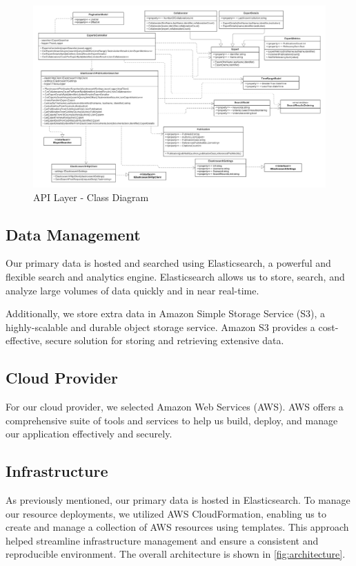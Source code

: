 \begin{figure}[htp]
    \centering
    \includegraphics[width=\textwidth]{Images/API_ClassDiagram.png}
    \caption{API Layer - Class Diagram}
    \label{fig:api-layer}
\end{figure}

\subsection{Data Management}

Our primary data is hosted and searched using Elasticsearch, a powerful and flexible search and analytics engine. Elasticsearch allows us to store, search, and analyze large volumes of data quickly and in near real-time.

Additionally, we store extra data in Amazon Simple Storage Service (S3), a highly-scalable and durable object storage service. Amazon S3 provides a cost-effective, secure solution for storing and retrieving extensive data.

\subsection{Cloud Provider}

For our cloud provider, we selected Amazon Web Services (AWS). AWS offers a comprehensive suite of tools and services to help us build, deploy, and manage our application effectively and securely.

\subsection{Infrastructure}

As previously mentioned, our primary data is hosted in Elasticsearch. To manage our resource deployments, we utilized AWS CloudFormation,  enabling us to create and manage a collection of AWS resources using templates. This approach helped streamline infrastructure management and ensure a consistent and reproducible environment. The overall architecture is shown in \autoref{fig:architecture}.

